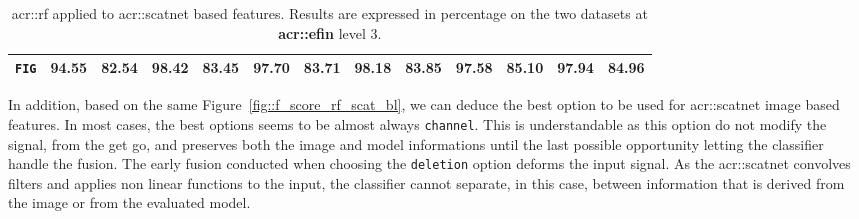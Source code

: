 \begin{sidewaystable}[htpb]
\begin{tabular}{| c | c c | c c | c c | c c | c c | c c |}
                    \hline
                    \texttt{FIG} & 94.55 & 82.54 & 98.42 & 83.45 & 97.70 & 83.71 & 98.18 & 83.85 & 97.58 & 85.10 & \textbf{97.94} & \textbf{84.96} \\
                    \hline
                \end{tabular}
                \caption{
                    \label{tab::stats_scat_rf_f3}
                    \gls{acr::rf} applied to \gls{acr::scatnet} based features.
                    Results are expressed in percentage on the two datasets at \textbf{\gls{acr::efin}} level 3.
                }
            \end{sidewaystable}
            
            In addition, based on the same Figure~\ref{fig::f_score_rf_scat_bl}, we can deduce the best option to be used for \gls{acr::scatnet} image based features.
            In most cases, the best options seems to be almost always \texttt{channel}.
            This is understandable as this option do not modify the signal, from the get go, and preserves both the image and model informations until the last possible opportunity letting the classifier handle the fusion.
            The early fusion conducted when choosing the \texttt{deletion} option deforms the input signal.
            As the \gls{acr::scatnet} convolves filters and applies non linear functions to the input, the classifier cannot separate, in this case, between information that is derived from the image or from the evaluated model.\\

